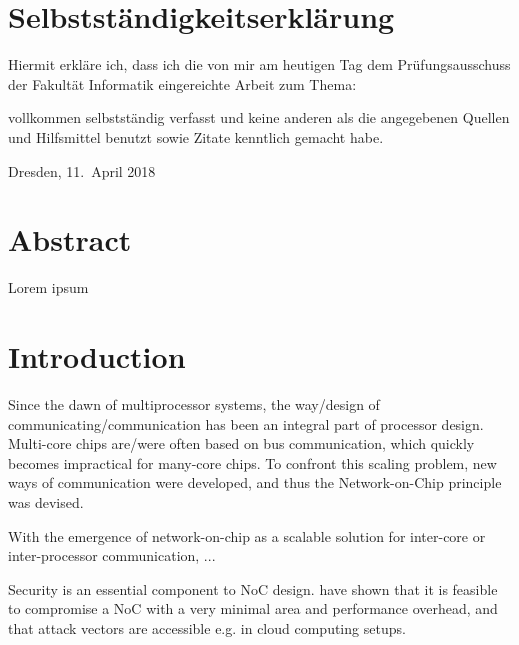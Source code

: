 \documentclass[
	paper=a4,
	fontsize=11pt,
	parskip=full %
]{scrreprt}
\begin{document}
	\chapter*{Selbstständigkeitserklärung}
	Hiermit erkläre ich, dass ich die von mir am heutigen Tag dem Prüfungsausschuss der Fakultät Informatik eingereichte Arbeit zum Thema:
	\begin{center}
		\textit{\thetitle} 
	\end{center}
	
	vollkommen selbstständig verfasst und keine anderen als die angegebenen Quellen und Hilfsmittel benutzt sowie Zitate kenntlich gemacht habe.
	
	Dresden, 11.\ April 2018 \\ %
	\theauthor
	
	
	\chapter*{Abstract}
    Lorem ipsum
	
	\tableofcontents
	
	
	\listoftables
	\vspace{-2.6\baselineskip}
	\begingroup
	\let\clearpage\relax
	\listoffigures
	\endgroup
	
	
	\chapter{Introduction}\label{ch:introduction}
    Since the dawn of multiprocessor systems, the way/design of communicating/communication has been an integral part of processor design.
    Multi-core chips are/were often based on bus communication, which quickly becomes impractical for many-core chips.
    To confront this scaling problem, new ways of communication were developed, and thus the Network-on-Chip principle was devised.

    With the emergence of network-on-chip as a scalable solution for inter-core or inter-processor communication, ...

    Security is an essential component to NoC design. \citeauthor{ancajas14fortnocs} have shown that it is feasible to compromise a NoC with a very
    minimal area and performance overhead, and that attack vectors are accessible e.g. in cloud computing setups. \cite{ancajas14fortnocs}
\end{document}
